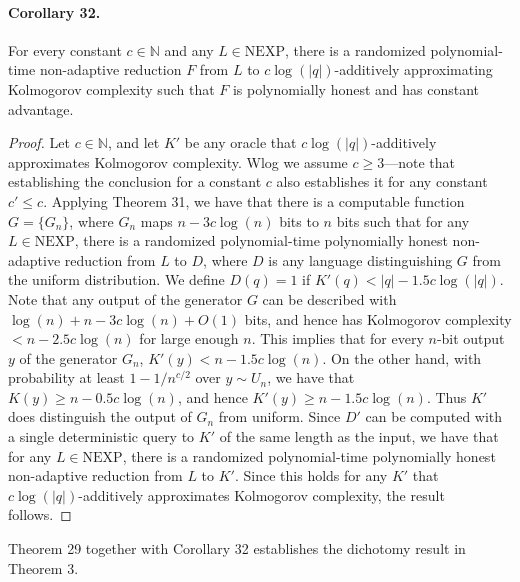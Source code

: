 \documentclass[10pt,a4paper]{article}
\begin{document}
\paragraph{Corollary 32.} For every constant $c\in\mathbb N$ and any $L\in\mathrm{NEXP}$, there is a randomized polynomial-time non-adaptive reduction $F$ from $L$ to $c\log(|q|)$-additively approximating Kolmogorov complexity such that $F$ is polynomially honest and has constant advantage.
\begin{proof}Let $c\in\mathbb N$, and let $K'$ be any oracle that $c\log(|q|)$-additively approximates Kolmogorov complexity. Wlog we assume $c\ge3$---note that establishing the conclusion for a constant $c$ also establishes it for any constant $c'\le c$. Applying Theorem 31, we have that there is a computable function $G=\{G_n\}$, where $G_n$ maps $n-3c\log(n)$ bits to $n$ bits such that for any $L\in\mathrm{NEXP}$, there is a randomized polynomial-time polynomially honest non-adaptive reduction from $L$ to $D$, where $D$ is any language distinguishing $G$ from the uniform distribution. We define $D(q)=1$ if $K'(q)<|q|-1.5c\log(|q|)$. Note that any output of the generator $G$ can be described with $\log(n)+n-3c\log(n)+O(1)$ bits, and hence has Kolmogorov complexity $<n-2.5c\log(n)$ for large enough $n$. This implies that for every $n$-bit output $y$ of the generator $G_n$, $K'(y)<n-1.5c\log(n)$. On the other hand, with probability at least $1-1/n^{c/2}$ over $y\sim U_n$, we have that $K(y)\ge n-0.5c\log(n)$, and hence $K'(y)\ge n-1.5c\log(n)$. Thus $K'$ does distinguish the output of $G_n$ from uniform. Since $D'$ can be computed with a single deterministic query to $K'$ of the same length as the input, we have that for any $L\in\mathrm{NEXP}$, there is a randomized polynomial-time polynomially honest non-adaptive reduction from $L$ to $K'$. Since this holds for any $K'$ that $c\log(|q|)$-additively approximates Kolmogorov complexity, the result follows.\end{proof}
Theorem 29 together with Corollary 32 establishes the dichotomy result in Theorem 3.
\end{document}
